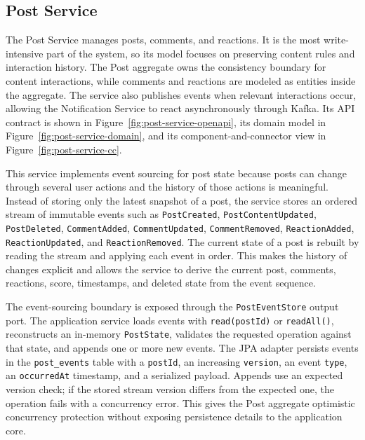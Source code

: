 \documentclass[12pt,a4paper]{article}
\begin{document}
\FloatBarrier

\subsection{Post Service}

The Post Service manages posts, comments, and reactions. It is the most write-intensive part of the system, so its model focuses on preserving content rules and interaction history. The Post aggregate owns the consistency boundary for content interactions, while comments and reactions are modeled as entities inside the aggregate. The service also publishes events when relevant interactions occur, allowing the Notification Service to react asynchronously through Kafka. Its API contract is shown in Figure~\ref{fig:post-service-openapi}, its domain model in Figure~\ref{fig:post-service-domain}, and its component-and-connector view in Figure~\ref{fig:post-service-cc}.

This service implements event sourcing for post state because posts can change through several user actions and the history of those actions is meaningful. Instead of storing only the latest snapshot of a post, the service stores an ordered stream of immutable events such as \texttt{PostCreated}, \texttt{PostContentUpdated}, \texttt{PostDeleted}, \texttt{CommentAdded}, \texttt{CommentUpdated}, \texttt{CommentRemoved}, \texttt{ReactionAdded}, \texttt{ReactionUpdated}, and \texttt{ReactionRemoved}. The current state of a post is rebuilt by reading the stream and applying each event in order. This makes the history of changes explicit and allows the service to derive the current post, comments, reactions, score, timestamps, and deleted state from the event sequence.

The event-sourcing boundary is exposed through the \texttt{PostEventStore} output port. The application service loads events with \texttt{read(postId)} or \texttt{readAll()}, reconstructs an in-memory \texttt{PostState}, validates the requested operation against that state, and appends one or more new events. The JPA adapter persists events in the \texttt{post\_events} table with a \texttt{postId}, an increasing \texttt{version}, an event \texttt{type}, an \texttt{occurredAt} timestamp, and a serialized payload. Appends use an expected version check; if the stored stream version differs from the expected one, the operation fails with a concurrency error. This gives the Post aggregate optimistic concurrency protection without exposing persistence details to the application core.
\end{document}
